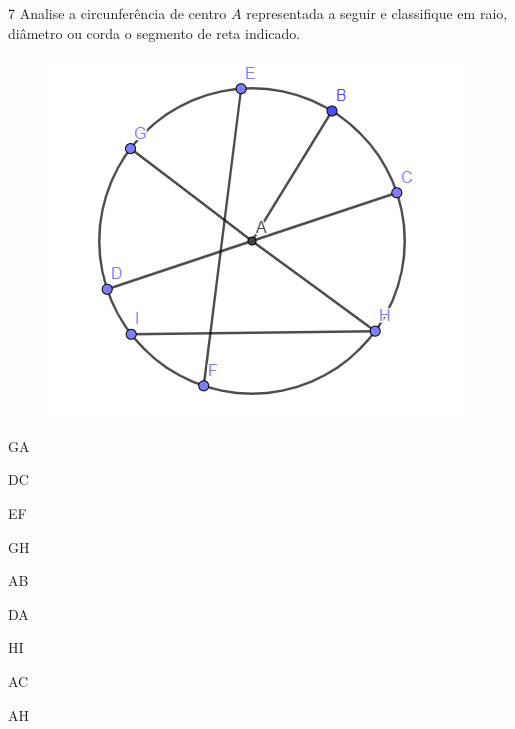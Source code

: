 \num{7} Analise a circunferência de centro $A$ representada a seguir e
classifique em raio, diâmetro ou corda o segmento de reta indicado.

\begin{figure}[H]
\centering\includegraphics[width=.75\textwidth]{./imgSAEB_8_MAT/media/image12.png}
\end{figure}

\pagebreak

\begin{escolha}
\item GA\\

\item DC\\

\item EF\\

\item GH\\

\item AB\\

\item DA\\

\item HI\\

\item AC\\

\item AH\\

\end{escolha}


